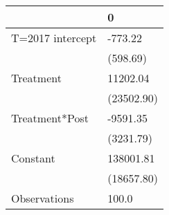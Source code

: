 \begin{tabular}{ll}
\toprule
{} &           0 \\
\midrule
T=2017 intercept &     -773.22 \\
                 &    (598.69) \\
Treatment        &    11202.04 \\
                 &  (23502.90) \\
Treatment*Post   &    -9591.35 \\
                 &   (3231.79) \\
Constant         &   138001.81 \\
                 &  (18657.80) \\
Observations     &       100.0 \\
\bottomrule
\end{tabular}
